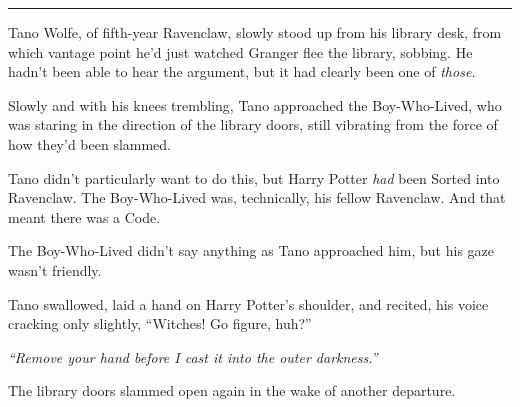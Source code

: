 \begin{center}\rule{3in}{0.4pt}\end{center}

Tano Wolfe, of fifth-year Ravenclaw, slowly stood up from his library
desk, from which vantage point he'd just watched Granger flee the
library, sobbing. He hadn't been able to hear the argument, but it had
clearly been one of \emph{those.}

Slowly and with his knees trembling, Tano approached the Boy-Who-Lived,
who was staring in the direction of the library doors, still vibrating
from the force of how they'd been slammed.

Tano didn't particularly want to do this, but Harry Potter \emph{had}
been Sorted into Ravenclaw. The Boy-Who-Lived was, technically, his
fellow Ravenclaw. And that meant there was a Code.

The Boy-Who-Lived didn't say anything as Tano approached him, but his
gaze wasn't friendly.

Tano swallowed, laid a hand on Harry Potter's shoulder, and recited, his
voice cracking only slightly, ``Witches! Go figure, huh?''

\emph{``Remove your hand before I cast it into the outer darkness.''}

The library doors slammed open again in the wake of another departure.
